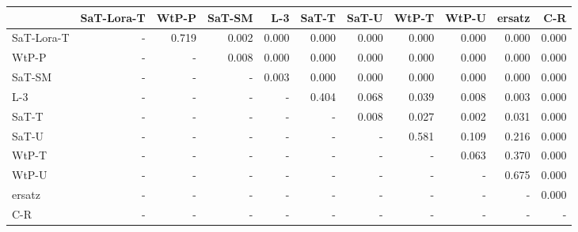 \begin{tabular}{lrrrrrrrrrr}
\toprule
 & SaT-Lora-T & WtP-P & SaT-SM & L-3 & SaT-T & SaT-U & WtP-T & WtP-U & ersatz & C-R \\
\midrule
SaT-Lora-T & - & 0.719 & 0.002 & 0.000 & 0.000 & 0.000 & 0.000 & 0.000 & 0.000 & 0.000 \\
WtP-P & - & - & 0.008 & 0.000 & 0.000 & 0.000 & 0.000 & 0.000 & 0.000 & 0.000 \\
SaT-SM & - & - & - & 0.003 & 0.000 & 0.000 & 0.000 & 0.000 & 0.000 & 0.000 \\
L-3 & - & - & - & - & 0.404 & 0.068 & 0.039 & 0.008 & 0.003 & 0.000 \\
SaT-T & - & - & - & - & - & 0.008 & 0.027 & 0.002 & 0.031 & 0.000 \\
SaT-U & - & - & - & - & - & - & 0.581 & 0.109 & 0.216 & 0.000 \\
WtP-T & - & - & - & - & - & - & - & 0.063 & 0.370 & 0.000 \\
WtP-U & - & - & - & - & - & - & - & - & 0.675 & 0.000 \\
ersatz & - & - & - & - & - & - & - & - & - & 0.000 \\
C-R & - & - & - & - & - & - & - & - & - & - \\
\bottomrule
\end{tabular}

